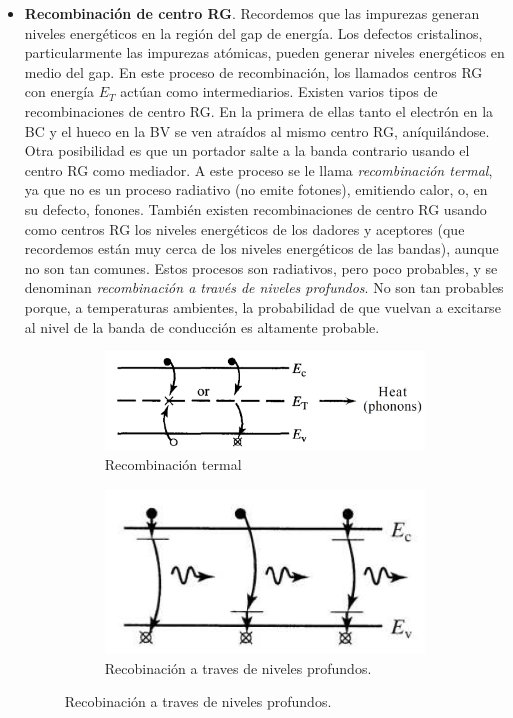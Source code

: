 \begin{itemize}
	\item \textbf{Recombinación de centro RG}. Recordemos que las impurezas generan niveles energéticos en la región del gap de energía. Los defectos cristalinos, particularmente las impurezas atómicas, pueden generar niveles energéticos en medio del gap. En este proceso de recombinación, los llamados centros RG con energía $E_T$ actúan como intermediarios. Existen varios tipos de recombinaciones de centro RG. En la primera de ellas tanto el electrón en la BC y el hueco en la BV se ven atraídos al mismo centro RG, aníquilándose. Otra posibilidad es que un portador salte a la banda contrario usando el centro RG como mediador. A este proceso se le llama \textit{recombinación termal}, ya que no es un proceso radiativo (no emite fotones), emitiendo calor, o, en su defecto, fonones. También existen recombinaciones de centro RG usando como centros RG los niveles energéticos de los dadores y aceptores (que recordemos están muy cerca de los niveles energéticos de las bandas), aunque no son tan comunes. Estos procesos son radiativos, pero poco probables, y se denominan \textit{recombinación a través de niveles profundos}. No son tan probables porque, a temperaturas ambientes, la probabilidad de que vuelvan a excitarse al nivel de la banda de conducción es altamente probable.
	\begin{figure}[h!] \centering
		\begin{subfigure}{0.45\linewidth} \centering
			\includegraphics[width=1\linewidth]{Cuerpo/Ch_02/02_R_RG.png}
			\caption{Recombinación termal}
		\end{subfigure}
		\begin{subfigure}{0.45\linewidth} \centering
			\includegraphics[width=0.8\linewidth]{Cuerpo/Ch_02/02_R_RG_2.png}
			\caption{Recobinación a traves de niveles profundos.}
		\end{subfigure}
	\end{figure}


\end{itemize}
